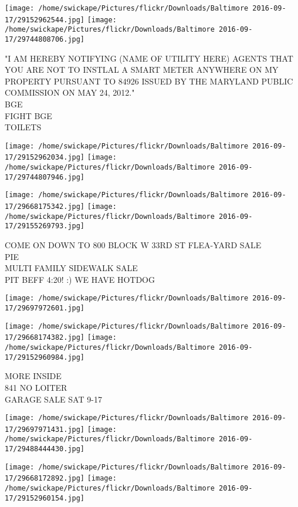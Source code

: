 \documentclass[10pt,letterpaper]{article}
\begin{document}
\texttt{[image: /home/swickape/Pictures/flickr/Downloads/Baltimore 2016-09-17/29152962544.jpg]}
\texttt{[image: /home/swickape/Pictures/flickr/Downloads/Baltimore 2016-09-17/29744808706.jpg]}

"I AM HEREBY NOTIFYING (NAME OF UTILITY HERE) AGENTS THAT YOU ARE NOT TO INSTLAL A SMART METER ANYWHERE ON MY PROPERTY PURSUANT TO 84926 ISSUED BY THE MARYLAND PUBLIC COMMISSION ON MAY 24, 2012."\\
BGE\\
FIGHT BGE\\
TOILETS
\pagebreak

\texttt{[image: /home/swickape/Pictures/flickr/Downloads/Baltimore 2016-09-17/29152962034.jpg]}
\texttt{[image: /home/swickape/Pictures/flickr/Downloads/Baltimore 2016-09-17/29744807946.jpg]}

\texttt{[image: /home/swickape/Pictures/flickr/Downloads/Baltimore 2016-09-17/29668175342.jpg]}
\texttt{[image: /home/swickape/Pictures/flickr/Downloads/Baltimore 2016-09-17/29155269793.jpg]}

COME ON DOWN TO 800 BLOCK W 33RD ST FLEA{-}YARD SALE\\
PIE\\
MULTI FAMILY SIDEWALK SALE\\
PIT BEFF 4:20! :) WE HAVE HOTDOG
\pagebreak

\texttt{[image: /home/swickape/Pictures/flickr/Downloads/Baltimore 2016-09-17/29697972601.jpg]}

\vspace{0.25in}
\texttt{[image: /home/swickape/Pictures/flickr/Downloads/Baltimore 2016-09-17/29668174382.jpg]}
\texttt{[image: /home/swickape/Pictures/flickr/Downloads/Baltimore 2016-09-17/29152960984.jpg]}

MORE INSIDE\\
841 NO LOITER\\
GARAGE SALE SAT 9{-}17
\pagebreak

\texttt{[image: /home/swickape/Pictures/flickr/Downloads/Baltimore 2016-09-17/29697971431.jpg]}
\texttt{[image: /home/swickape/Pictures/flickr/Downloads/Baltimore 2016-09-17/29488444430.jpg]}

\texttt{[image: /home/swickape/Pictures/flickr/Downloads/Baltimore 2016-09-17/29668172892.jpg]}
\texttt{[image: /home/swickape/Pictures/flickr/Downloads/Baltimore 2016-09-17/29152960154.jpg]}
\end{document}
